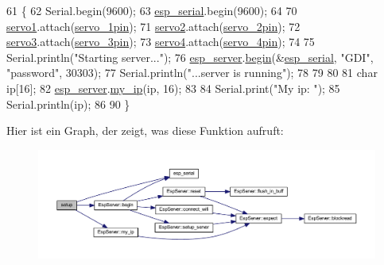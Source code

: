\begin{DoxyCode}
61              \{
62   Serial.begin(9600);
63   \hyperlink{_arduino__kommentiert_8ino_af690b3a6882292855c4091ede8039998}{esp\_serial}.begin(9600);
64 
70   \hyperlink{_arduino__kommentiert_8ino_ac5d2bea44c6318454db0e2639a4efe95}{servo1}.attach(\hyperlink{_arduino__kommentiert_8ino_ac5b3a3df1bbdb6b2c8e8988c7373ad97}{servo\_1pin});
71   \hyperlink{_arduino__kommentiert_8ino_a6458146b8e54c3729bbee8c037921c72}{servo2}.attach(\hyperlink{_arduino__kommentiert_8ino_a0fcb42829030c7eab1ede7429256f14d}{servo\_2pin});
72   \hyperlink{_arduino__kommentiert_8ino_a7c0244e667b5f7c873df01946f0767bd}{servo3}.attach(\hyperlink{_arduino__kommentiert_8ino_a006b96047ca9585e312d88690d5a95a3}{servo\_3pin});
73   \hyperlink{_arduino__kommentiert_8ino_a207f149c99b91a8bacd26b8b70dfc71c}{servo4}.attach(\hyperlink{_arduino__kommentiert_8ino_a5c0d394c06f48072ed4a5cf3f5f3b81b}{servo\_4pin});
74 
75   Serial.println(\textcolor{stringliteral}{"Starting server..."});
76   \hyperlink{_arduino__kommentiert_8ino_a92309e3a6d185d9188757bac49168fe5}{esp\_server}.\hyperlink{class_esp_server_a1d8682ca0934af03639311e23a71283f}{begin}(&\hyperlink{_arduino__kommentiert_8ino_af690b3a6882292855c4091ede8039998}{esp\_serial}, \textcolor{stringliteral}{"GDI"}, \textcolor{stringliteral}{"password"}, 30303);
77   Serial.println(\textcolor{stringliteral}{"...server is running"});
78 
79 
80   
81   \textcolor{keywordtype}{char} ip[16];
82   \hyperlink{_arduino__kommentiert_8ino_a92309e3a6d185d9188757bac49168fe5}{esp\_server}.\hyperlink{class_esp_server_a01953c4cc039c37f94dc3e1057126abb}{my\_ip}(ip, 16);
83 
84   Serial.print(\textcolor{stringliteral}{"My ip: "});
85   Serial.println(ip);
86 
90 \}
\end{DoxyCode}
Hier ist ein Graph, der zeigt, was diese Funktion aufruft\+:\nopagebreak
\begin{figure}[H]
\begin{center}
\leavevmode
\includegraphics[width=350pt]{_arduino__kommentiert_8ino_a4fc01d736fe50cf5b977f755b675f11d_cgraph}
\end{center}
\end{figure}
\mbox{\label{_arduino__kommentiert_8ino_ac03f54892f7473625ec7d6498ea5a010}} 

